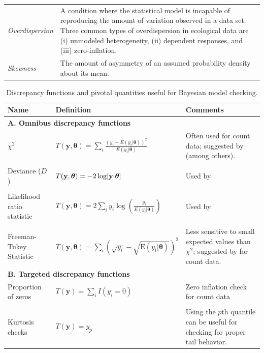 \documentclass[12pt,english]{article}
\begin{document}
\begin{spacing}{1.9}
\begin{table}[htp]
\begin{tabular}{p{3cm}p{13cm}}
    \textit{Overdispersion} & A condition where the statistical model is incapable of reproducing the amount of variation observed in a data set.  Three common types of overdispersion in ecological data are (i) unmodeled heterogeneity, (ii) dependent responses, and (iii) zero-inflation. \\
    \textit{Skewness} & The amount of asymmetry of an assumed probability density about its mean.   \\
    \hline
  \end{tabular}
\end{table}

\pagebreak


\begin{table}[htp]
  \caption{Discrepancy functions and pivotal quantities useful for Bayesian model checking.
  }
  \label{tab:discrepancy}
  \centering
  \begin{tabular}{p{4cm}lp{5cm}}
    \hline
    Name & Definition & Comments \\
    \hline
    \multicolumn{3}{l}{\textbf{A. Omnibus discrepancy functions}} \\
    $\chi^2$ & $T(\textbf{y},\boldsymbol{\theta}) = \sum_i \frac{(y_i - E(y_i|\boldsymbol{\theta}))^2}{E(y_i|\boldsymbol{\theta})}$ & Often used for count data; suggested by \citet{GelmanEtAl2014} (among others).\\
         & & \\
    Deviance ($D$) &  $T(\textbf{y},\boldsymbol{\theta}) = -2 \log [{\bf y} | \boldsymbol{\theta}]$ & Used by \citet{KingEtAl2009}\\
         & & \\
    Likelihood ratio statistic & $T(\textbf{y},\boldsymbol{\theta}) = 2 \sum_i y_i \log(\frac{y_i}{E(y_i|\boldsymbol{\theta})})$ & Used by \citet{LunnEtAl2013} \\
         & & \\
    Freeman-Tukey Statistic & $T(\textbf{y},\boldsymbol{\theta})=\sum_i (\sqrt{y_i}-\sqrt{\textrm{E}(y_i|\boldsymbol{\theta})})^2$ & Less sensitive to small expected values than $\chi^2$; suggested by \citet{KeryRoyle2016} for count data.\\
    \multicolumn{3}{l}{\textbf{B. Targeted discrepancy functions}} \\
    Proportion of zeros & $T(\textbf{y}) = \sum_i I(y_i = 0) $ & Zero inflation check for count data \\
         & & \\
    Kurtosis checks & $T(\textbf{y}) = y_{p} $ & Using the $p$th quantile can be useful for checking for proper tail behavior. \\

\end{tabular}
\end{table}
\end{spacing}
\end{document}
